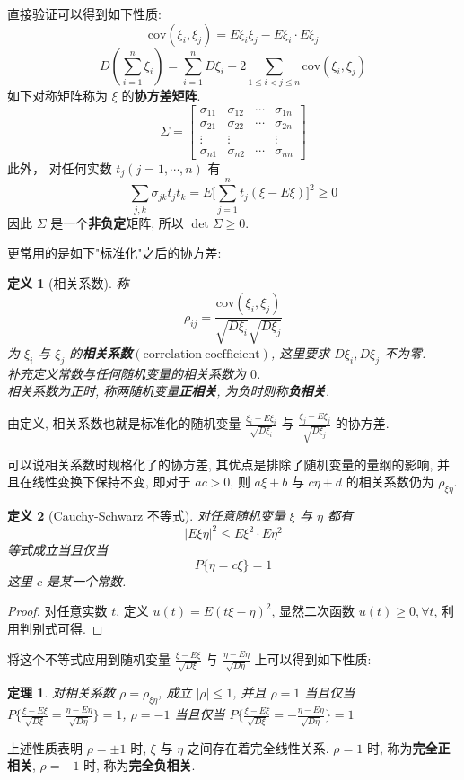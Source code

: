 \documentclass[12pt,a4paper]{article}
\newtheorem{thm}{定理}[subsection]  %
\newtheorem{definition}{定义}[subsection] %
\begin{document}
直接验证可以得到如下性质:
\[\mathrm{cov}(\xi_i, \xi_j) = E\xi_i \xi_j - E\xi_i \cdot E\xi_j\]
\[D(\sum\limits_{i=1}^{n} \xi_i) = \sum\limits_{i=1}^n D\xi_i + 2\sum\limits_{1 \leq i < j \leq n} \mathrm{cov}(\xi_i, \xi_j)\]
如下对称矩阵称为 $\xi$ 的\textbf{协方差矩阵}.
\[\Sigma = 
\begin{bmatrix}
    \sigma_{11} & \sigma_{12} & \cdots & \sigma_{1n} \\
    \sigma_{21} & \sigma_{22} & \cdots & \sigma_{2n} \\
    \vdots & \vdots & & \vdots \\
    \sigma_{n1} & \sigma_{n2} & \cdots & \sigma_{nn}
\end{bmatrix}\]
此外， 对任何实数 $t_j(j=1, \cdots, n)$ 有\[\sum\limits_{j,k} \sigma_{jk}t_j t_k = E\Big[\sum\limits_{j=1}^n t_j (\xi - E\xi)\Big]^2 \geq 0\]
因此 $\Sigma$ 是一个\textbf{非负定}矩阵, 所以 $\det \Sigma \geq 0$.

更常用的是如下"标准化"之后的协方差:
\begin{definition}[相关系数]
    称\[\rho_{ij} = \frac{\mathrm{cov}(\xi_i, \xi_j)}{\sqrt{D\xi_i}\sqrt{D\xi_j}}\]
    为 $\xi_i$ 与 $\xi_j$ 的\textbf{相关系数}$(\mathrm{correlation \ coefficient})$, 这里要求 $D\xi_i, D\xi_j$ 不为零. \\
    补充定义常数与任何随机变量的相关系数为 $0$.\\
    相关系数为正时, 称两随机变量\textbf{正相关}, 为负时则称\textbf{负相关}.
\end{definition}
由定义, 相关系数也就是标准化的随机变量 $\frac{\xi_i - E\xi_i}{\sqrt{D\xi_i}}$ 与 $\frac{\xi_j - E\xi_j}{\sqrt{D\xi_j}}$ 的协方差.

可以说相关系数时规格化了的协方差, 其优点是排除了随机变量的量纲的影响, 并且在线性变换下保持不变, 即对于 $ac>0$, 则 $a\xi+b$ 与 $c\eta+d$ 的相关系数仍为 $\rho_{\xi \eta}$.
\begin{definition}[Cauchy-Schwarz 不等式]
    对任意随机变量 $\xi$ 与 $\eta$ 都有 \[|E\xi\eta|^2 \leq E\xi^2 \cdot E\eta^2 \]
    等式成立当且仅当 \[P\{\eta = c\xi\} = 1\] 这里 $c$ 是某一个常数.
\end{definition}
\begin{proof}
    对任意实数 $t$, 定义 $u(t) = E(t\xi - \eta)^2$, 显然二次函数 $u(t) \geq 0, \forall t$, 利用判别式可得.
\end{proof}
将这个不等式应用到随机变量 $\frac{\xi - E\xi}{\sqrt{D\xi}}$ 与 $\frac{\eta - E\eta}{\sqrt{D\eta}}$ 上可以得到如下性质:
\begin{thm}
    对相关系数 $\rho = \rho_{\xi \eta}$, 成立 $|\rho| \leq 1$, 并且 $\rho = 1$ 当且仅当 $P\{\frac{\xi - E\xi}{\sqrt{D\xi}} = \frac{\eta - E\eta}{\sqrt{D\eta}}\} = 1$, 
    $\rho = -1$ 当且仅当 $P\{\frac{\xi - E\xi}{\sqrt{D\xi}} = -\frac{\eta - E\eta}{\sqrt{D\eta}}\} = 1$
\end{thm}
上述性质表明 $\rho = \pm 1$ 时, $\xi$ 与 $\eta$ 之间存在着完全线性关系. $\rho = 1$ 时, 称为\textbf{完全正相关}, $\rho = -1$ 时, 称为\textbf{完全负相关}.
\end{document}
